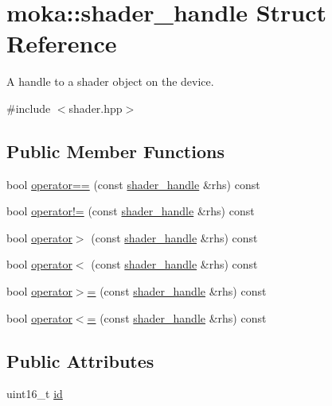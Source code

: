 \hypertarget{structmoka_1_1shader__handle}{}\section{moka\+::shader\+\_\+handle Struct Reference}
\label{structmoka_1_1shader__handle}


A handle to a shader object on the device.  




{\ttfamily \#include $<$shader.\+hpp$>$}

\subsection*{Public Member Functions}
\begin{DoxyCompactItemize}
\item 
bool \mbox{\hyperlink{structmoka_1_1shader__handle_a96891cd7aa94766a22b5caa913387551}{operator==}} (const \mbox{\hyperlink{structmoka_1_1shader__handle}{shader\+\_\+handle}} \&rhs) const
\item 
bool \mbox{\hyperlink{structmoka_1_1shader__handle_a45ea92028769bc8bda10522f639c0d97}{operator!=}} (const \mbox{\hyperlink{structmoka_1_1shader__handle}{shader\+\_\+handle}} \&rhs) const
\item 
bool \mbox{\hyperlink{structmoka_1_1shader__handle_a4cc2bab1d2c0ddc054bf659b7541200c}{operator$>$}} (const \mbox{\hyperlink{structmoka_1_1shader__handle}{shader\+\_\+handle}} \&rhs) const
\item 
bool \mbox{\hyperlink{structmoka_1_1shader__handle_a1b4d9ec39e50ad14ae55b4b99ec36e53}{operator$<$}} (const \mbox{\hyperlink{structmoka_1_1shader__handle}{shader\+\_\+handle}} \&rhs) const
\item 
bool \mbox{\hyperlink{structmoka_1_1shader__handle_ab61e1c889ebff6662c1b79c7c4d19be5}{operator$>$=}} (const \mbox{\hyperlink{structmoka_1_1shader__handle}{shader\+\_\+handle}} \&rhs) const
\item 
bool \mbox{\hyperlink{structmoka_1_1shader__handle_a63f2fc67f7d374ec06da5d6922b25894}{operator$<$=}} (const \mbox{\hyperlink{structmoka_1_1shader__handle}{shader\+\_\+handle}} \&rhs) const
\end{DoxyCompactItemize}
\subsection*{Public Attributes}
\begin{DoxyCompactItemize}
\item 
uint16\+\_\+t \mbox{\hyperlink{structmoka_1_1shader__handle_a0bfa42b516494512cdb1b84e47d1c98e}{id}}
\end{DoxyCompactItemize}


